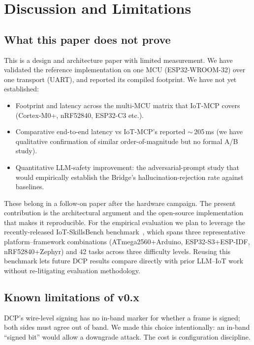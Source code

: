 \documentclass[11pt,a4paper]{article}
\begin{document}
\section{Discussion and Limitations}\label{sec:discussion}

\subsection{What this paper does not prove}

This is a design and architecture paper with limited measurement. We have
validated the reference implementation on one MCU (ESP32-WROOM-32) over
one transport (UART), and reported its compiled footprint. We have not
yet established:

\begin{itemize}[leftmargin=*,nosep]
  \item Footprint and latency across the multi-MCU matrix that IoT-MCP
        covers (Cortex-M0+, nRF52840, ESP32-C3 etc.).
  \item Comparative end-to-end latency vs IoT-MCP's reported
        $\sim$\,205\,ms (we have qualitative confirmation of similar
        order-of-magnitude but no formal A/B study).
  \item Quantitative LLM-safety improvement: the adversarial-prompt
        study that would empirically establish the Bridge's
        hallucination-rejection rate against baselines.
\end{itemize}

These belong in a follow-on paper after the hardware campaign. The present
contribution is the architectural argument and the open-source
implementation that makes it reproducible. For the empirical evaluation we
plan to leverage the recently-released IoT-SkillsBench
benchmark~\cite{iot_skillsbench}, which spans three representative
platform--framework combinations (ATmega2560+Arduino, ESP32-S3+ESP-IDF,
nRF52840+Zephyr) and 42 tasks across three difficulty levels. Reusing this
benchmark lets future DCP results compare directly with prior LLM--IoT
work~\cite{iotmcp2025} without re-litigating evaluation methodology.

\subsection{Known limitations of v0.x}

DCP's wire-level signing has no in-band marker for whether a frame is
signed; both sides must agree out of band. We made this choice
intentionally: an in-band ``signed bit'' would allow a downgrade attack.
The cost is configuration discipline.
\end{document}
